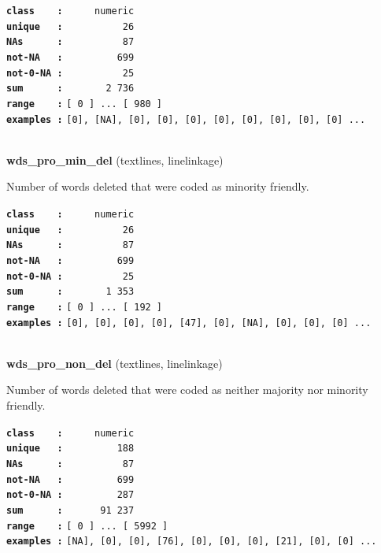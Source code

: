 \documentclass[]{article}
\begin{document}
\textbf{\texttt{class\ \ \ \ :}} \texttt{~~~~~numeric}\\
\textbf{\texttt{unique\ \ \ :}} \texttt{~~~~~~~~~~26}\\
\textbf{\texttt{NAs\ \ \ \ \ \ :}} \texttt{~~~~~~~~~~87}\\
\textbf{\texttt{not-NA\ \ \ :}} \texttt{~~~~~~~~~699}\\
\textbf{\texttt{not-0-NA\ :}} \texttt{~~~~~~~~~~25}\\
\textbf{\texttt{sum\ \ \ \ \ \ :}} \texttt{~~~~~~~2~736}\\
\textbf{\texttt{range\ \ \ \ :}}
\texttt{{[}\ 0\ {]}\ ...\ {[}\ 980\ {]}}\\
\textbf{\texttt{examples\ :}}
\texttt{{[}0{]},\ {[}NA{]},\ {[}0{]},\ {[}0{]},\ {[}0{]},\ {[}0{]},\ {[}0{]},\ {[}0{]},\ {[}0{]},\ {[}0{]}\ ...}\\

~

\textbf{wds\_pro\_min\_del} (textlines, linelinkage)

Number of words deleted that were coded as minority friendly.

\textbf{\texttt{class\ \ \ \ :}} \texttt{~~~~~numeric}\\
\textbf{\texttt{unique\ \ \ :}} \texttt{~~~~~~~~~~26}\\
\textbf{\texttt{NAs\ \ \ \ \ \ :}} \texttt{~~~~~~~~~~87}\\
\textbf{\texttt{not-NA\ \ \ :}} \texttt{~~~~~~~~~699}\\
\textbf{\texttt{not-0-NA\ :}} \texttt{~~~~~~~~~~25}\\
\textbf{\texttt{sum\ \ \ \ \ \ :}} \texttt{~~~~~~~1~353}\\
\textbf{\texttt{range\ \ \ \ :}}
\texttt{{[}\ 0\ {]}\ ...\ {[}\ 192\ {]}}\\
\textbf{\texttt{examples\ :}}
\texttt{{[}0{]},\ {[}0{]},\ {[}0{]},\ {[}0{]},\ {[}47{]},\ {[}0{]},\ {[}NA{]},\ {[}0{]},\ {[}0{]},\ {[}0{]}\ ...}\\

~

\textbf{wds\_pro\_non\_del} (textlines, linelinkage)

Number of words deleted that were coded as neither majority nor minority
friendly.

\textbf{\texttt{class\ \ \ \ :}} \texttt{~~~~~numeric}\\
\textbf{\texttt{unique\ \ \ :}} \texttt{~~~~~~~~~188}\\
\textbf{\texttt{NAs\ \ \ \ \ \ :}} \texttt{~~~~~~~~~~87}\\
\textbf{\texttt{not-NA\ \ \ :}} \texttt{~~~~~~~~~699}\\
\textbf{\texttt{not-0-NA\ :}} \texttt{~~~~~~~~~287}\\
\textbf{\texttt{sum\ \ \ \ \ \ :}} \texttt{~~~~~~91~237}\\
\textbf{\texttt{range\ \ \ \ :}}
\texttt{{[}\ 0\ {]}\ ...\ {[}\ 5992\ {]}}\\
\textbf{\texttt{examples\ :}}
\texttt{{[}NA{]},\ {[}0{]},\ {[}0{]},\ {[}76{]},\ {[}0{]},\ {[}0{]},\ {[}0{]},\ {[}21{]},\ {[}0{]},\ {[}0{]}\ ...}\\
\end{document}
